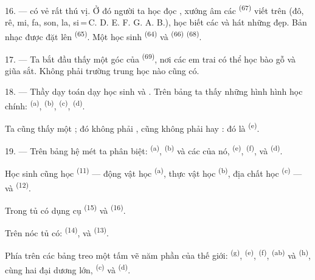16. ---  có vẻ rất thú vị. Ở đó người ta học đọc , xướng
âm các  \textsuperscript{(67)} viết trên  (đô,
rê, mi, fa, son, la, si\,=\,C. D. E. F. G. A. B.), học biết các  và
hát những  đẹp. Bản nhạc được đặt lên 
\textsuperscript{(65)}. Một học sinh  \textsuperscript{(64)}
và  \textsuperscript{(66)} 
\textsuperscript{(68)}.

17. --- Ta bắt đầu thấy một góc của  \textsuperscript{(69)}, nơi
các em trai có thể học bào gỗ và giũa sắt. Không phải trường trung học nào cũng có.

\VUsaut{5.0mm}
\VUsaut{3.6mm}

18. --- Thầy dạy toán dạy học sinh  và
. Trên bảng ta thấy những hình hình học chính: 
\textsuperscript{(a)},  \textsuperscript{(b)}, 
\textsuperscript{(c)},  \textsuperscript{(d)}.

Ta cũng thấy một ; đó không phải , cũng không phải
 hay : đó là 
\textsuperscript{(e)}.

19. --- Trên bảng hệ mét ta phân biệt:  \textsuperscript{(a)},
 \textsuperscript{(b)} và các  của nó, 
\textsuperscript{(e)},  \textsuperscript{(f)},  và
 \textsuperscript{(d)}.

Học sinh cũng học  \textsuperscript{(11)} --- động vật học
\textsuperscript{(a)}, thực vật học \textsuperscript{(b)}, địa chất học
\textsuperscript{(c)} --- và  \textsuperscript{(12)}.

Trong tủ có dụng cụ  \textsuperscript{(15)} và 
\textsuperscript{(16)}.

Trên nóc tủ có:  \textsuperscript{(14)},  và
 \textsuperscript{(13)}.

Phía trên các bảng treo một tấm  vẽ năm phần của thế giới:
 \textsuperscript{(g)},  \textsuperscript{(e)},
 \textsuperscript{(f)},  \textsuperscript{(ab)} và
 \textsuperscript{(h)}, cùng hai đại dương lớn,
 \textsuperscript{(c)} và 
\textsuperscript{(d)}.
\VUsaut{6.0mm}
\VUfilet{22mm}
